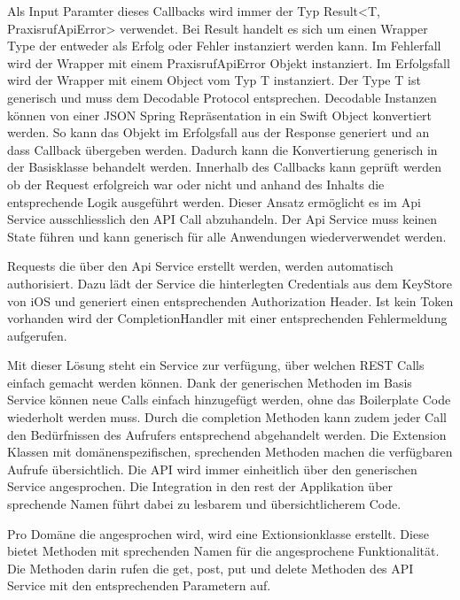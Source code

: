 

Als Input Paramter dieses Callbacks wird immer der Typ Result<T, PraxisrufApiError> verwendet.
Bei Result handelt es sich um einen Wrapper Type der entweder als Erfolg oder Fehler instanziert werden kann.
Im Fehlerfall wird der Wrapper mit einem PraxisrufApiError Objekt instanziert.
Im Erfolgsfall wird der Wrapper mit einem Object vom Typ T instanziert.
Der Type T ist generisch und muss dem Decodable Protocol entsprechen.
Decodable Instanzen können von einer JSON Spring Repräsentation in ein Swift Object konvertiert werden.
So kann das Objekt im Erfolgsfall aus der Response generiert und an dass Callback übergeben werden.
Dadurch kann die Konvertierung generisch in der Basisklasse behandelt werden.
Innerhalb des Callbacks kann geprüft werden ob der Request erfolgreich war oder nicht und anhand des Inhalts die entsprechende Logik ausgeführt werden.
Dieser Ansatz ermöglicht es im Api Service ausschliesslich den API Call abzuhandeln.
Der Api Service muss keinen State führen und kann generisch für alle Anwendungen wiederverwendet werden.

Requests die über den Api Service erstellt werden, werden automatisch authorisiert.
Dazu lädt der Service die hinterlegten Credentials aus dem KeyStore von iOS und generiert einen entsprechenden Authorization Header.
Ist kein Token vorhanden wird der CompletionHandler mit einer entsprechenden Fehlermeldung aufgerufen.

Mit dieser Lösung steht ein Service zur verfügung, über welchen REST Calls einfach gemacht werden können.
Dank der generischen Methoden im Basis Service können neue Calls einfach hinzugefügt werden, ohne das Boilerplate Code wiederholt werden muss.
Durch die completion Methoden kann zudem jeder Call den Bedürfnissen des Aufrufers entsprechend abgehandelt werden.
Die Extension Klassen mit domänenspezifischen, sprechenden Methoden machen die verfügbaren Aufrufe übersichtlich.
Die API wird immer einheitlich über den generischen Service angesprochen.
Die Integration in den rest der Applikation über sprechende Namen führt dabei zu lesbarem und übersichtlicherem Code.

Pro Domäne die angesprochen wird, wird eine Extionsionklasse erstellt.
Diese bietet Methoden mit sprechenden Namen für die angesprochene Funktionalität.
Die Methoden darin rufen die get, post, put und delete Methoden des API Service mit den entsprechenden Parametern auf.

